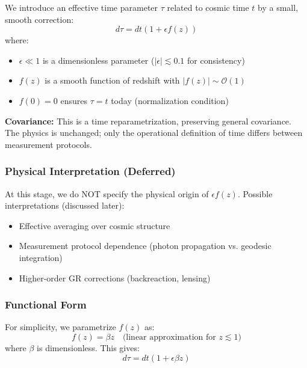 We introduce an effective time parameter $\tau$ related to cosmic time $t$ by a small, smooth correction:
\begin{equation}
d\tau = dt \left(1 + \epsilon f(z)\right)
\label{eq:tau_definition}
\end{equation}
where:
\begin{itemize}
    \item $\epsilon \ll 1$ is a dimensionless parameter ($|\epsilon| \lesssim 0.1$ for consistency)
    \item $f(z)$ is a smooth function of redshift with $|f(z)| \sim \mathcal{O}(1)$
    \item $f(0) = 0$ ensures $\tau = t$ today (normalization condition)
\end{itemize}

\textbf{Covariance:} This is a time reparametrization, preserving general covariance. The physics is unchanged; only the operational definition of time differs between measurement protocols.

\subsubsection{Physical Interpretation (Deferred)}

At this stage, we do NOT specify the physical origin of $\epsilon f(z)$. Possible interpretations (discussed later):
\begin{itemize}
    \item Effective averaging over cosmic structure
    \item Measurement protocol dependence (photon propagation vs. geodesic integration)
    \item Higher-order GR corrections (backreaction, lensing)
\end{itemize}

\subsubsection{Functional Form}

For simplicity, we parametrize $f(z)$ as:
\begin{equation}
f(z) = \beta z \quad \text{(linear approximation for } z \lesssim 1\text{)}
\label{eq:f_linear}
\end{equation}
where $\beta$ is dimensionless. This gives:
\begin{equation}
d\tau = dt (1 + \epsilon \beta z)
\label{eq:tau_linear}
\end{equation}


